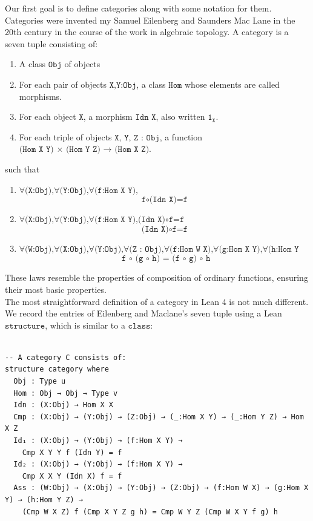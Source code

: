 \documentclass{book}
\newcounter{lcounter}
\begin{document}
Our first goal is to define categories along with some notation for them. Categories were invented my Samuel Eilenberg and Saunders Mac Lane in the 20th century in the course of the work in algebraic topology. A category is a seven tuple consisting of:
\begin{enumerate}
\item A class $\texttt{Obj}$ of objects
\item For each pair of objects $\texttt{X,Y:Obj}$, a class $\texttt{Hom}$ whose elements are called morphisms. 
\item For each object $\texttt{X}$, a morphism $\texttt{Idn X}$, also written $\texttt{1}_{\texttt{X}}$.
\item For each triple of objects $\texttt{X, Y, Z : Obj}$, a function $\texttt{(Hom X Y) × (Hom Y Z) → (Hom X Z)}$.
\end{enumerate}
such that
\begin{enumerate}
\item $\texttt{∀(X:Obj),∀(Y:Obj),∀(f:Hom X Y),}$
\[\texttt{f∘(Idn X)=f}\]
\item $\texttt{∀(X:Obj),∀(Y:Obj),∀(f:Hom X Y),(Idn X)∘f=f}$
\[\texttt{(Idn X)∘f=f}\]
\item $\texttt{∀(W:Obj),∀(X:Obj),∀(Y:Obj),∀(Z : Obj),∀(f:Hom W X),∀(g:Hom X Y),∀(h:Hom Y Z),}$
\[\texttt{ f ∘ (g ∘ h) = (f ∘ g) ∘ h} \]
\end{enumerate}
These laws resemble the properties of composition of ordinary functions, ensuring their most basic properties.\\

The most straightforward definition of a category in Lean 4 is not much different. We record the entries of Eilenberg and Maclane's seven tuple using a Lean $\texttt{structure}$, which is similar to a $\texttt{class}$:

\begin{center}
\begin{tcolorbox}[width=5in,colback={white},title={\begin{center}\texttt{Lean \thelcounter} \addtocounter{lcounter}{1}  \end{center}},colbacktitle=Blue,coltitle=black]
\begin{verbatim}

-- A category C consists of:
structure category where
  Obj : Type u
  Hom : Obj → Obj → Type v
  Idn : (X:Obj) → Hom X X
  Cmp : (X:Obj) → (Y:Obj) → (Z:Obj) → (_:Hom X Y) → (_:Hom Y Z) → Hom X Z
  Id₁ : (X:Obj) → (Y:Obj) → (f:Hom X Y) → 
    Cmp X Y Y f (Idn Y) = f
  Id₂ : (X:Obj) → (Y:Obj) → (f:Hom X Y) → 
    Cmp X X Y (Idn X) f = f
  Ass : (W:Obj) → (X:Obj) → (Y:Obj) → (Z:Obj) → (f:Hom W X) → (g:Hom X Y) → (h:Hom Y Z) →
    (Cmp W X Z) f (Cmp X Y Z g h) = Cmp W Y Z (Cmp W X Y f g) h

\end{verbatim}%
\end{tcolorbox}
\end{center}
\end{document}
